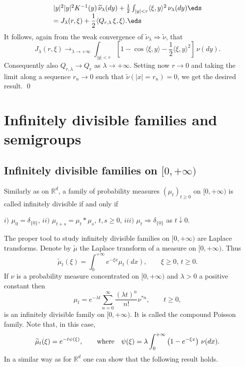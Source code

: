 \documentclass[preprint]{imsart}
\def\R{\mathbb R}
\def\ds{\displaystyle}
\begin{document}
{$$\begin{array}{l}
{}{|y|^2} |y|^2 K^{-1}(y)\,
\widetilde{\nu}_\lambda (dy)
+
\frac{1}{2}\int_{  |y|<r}
\langle \xi,y\rangle^2 \,
\nu_\lambda (dy)
\eds\\ \ds
=J_\lambda (r,\xi) +\frac{1}{2}
\langle Q_{r,\lambda}\, \xi,\xi\rangle.
\eds\end{array}
$$
It follows, again from the weak convergence of
$\widetilde{\nu}_\lambda\Rightarrow
\widetilde{\nu}$, that
$$
J_\lambda (r,\xi)\mathop{\longrightarrow}_{\lambda\to
+\infty}
\int_{  |y|<r}\left[
1- \cos \langle \xi,y\rangle
-\frac{1}{2} \langle \xi,y\rangle^2\right] \, \nu(dy).
$$
Consequently also $Q_{r,\lambda}\to Q_{r}$ as
$\lambda\to +\infty$. Setting now $r\to 0$
and taking the limit along a
sequence $r_n\to 0$ such that
$\widetilde{\nu}(|x|=r_n)=0$, we get the desired
result. \qed



\section{Infinitely divisible
families  and semigroups}


\subsection{Infinitely divisible families on $[0,+\infty)$}

Similarly as on $\R^d$, a family of probability measures $(\mu_t)_{t\geq 0}$ on
$[0,+\infty)$ is called infinitely divisible if and
only if

$i)$ $\mu_0=\delta_{\{ 0\} }$, $ii)$
$\mu_{t+s}=\mu_t
*
\mu_s$, $t,s\geq 0$, $iii)$ $\mu_t\Rightarrow
 \delta_{\{ 0\}}$ as $t\downarrow 0$.
\vspace{2mm}

\noindent The proper tool to study infinitely divisible families
on $[0,+\infty)$ are Laplace transforms. Denote by
$\widetilde{\mu}$ the Laplace transform of a measure on
$[0,+\infty)$. Thus
$$
\widetilde{\mu}_t(\xi ) =\int_0^{+\infty}
e^{-\xi x}\mu_t(dx),
\qquad \xi \geq 0,\, t\geq 0.
$$
If $\nu$ is a probability measure concentrated on
$[0,+\infty)$
 and $\lambda >0$ a
positive constant then
$$
\mu_t=e^{-\lambda t}\sum_{n=0}^\infty
\frac{(\lambda t)^n}{n!}\nu^{*n},
\qquad t\geq 0,
$$
is an infinitely divisible family on $[0,+\infty)$. It
is called the compound Poisson family. Note that, in
this case,
$$
\widetilde{\mu}_t(\xi ) =e^{-t\psi (\xi)},\qquad
{\rm where}\quad
\psi (\xi)= \lambda \int_0^{+\infty} \left(
1-e^{-\xi x}\right) \, \nu (dx).
$$
In a similar way as for $\R^d$ one can
show that the following result holds.

}
\end{document}

